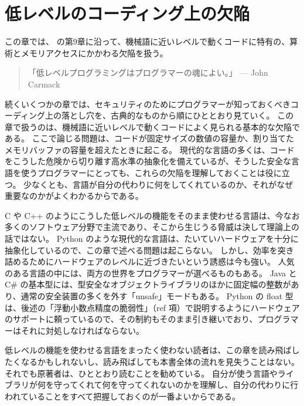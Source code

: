 \documentclass[uplatex]{jsarticle}
\def\ref#1{ref}%
\begin{document}
\section{低レベルのコーディング上の欠陥}

この章では、\cite{Kohnfelder2021} の第9章に沿って、機械語に近いレベルで動くコードに特有の、算術とメモリアクセスにかかわる欠陥を扱う。

\begin{quote}
「低レベルプログラミングはプログラマーの魂によい。」 --- John Carmack
\end{quote}

続くいくつかの章では、セキュリティのためにプログラマーが知っておくべきコーディング上の落とし穴を、古典的なものから順にひととおり見ていく。
この章で扱うのは、機械語に近いレベルで動くコードによく見られる基本的な欠陥である。
ここで論じる問題は、コードが固定サイズの数値の容量か、割り当てたメモリバッファの容量を超えたときに起こる。
現代的な言語の多くは、コードをこうした危険から切り離す高水準の抽象化を備えているが、そうした安全な言語を使うプログラマーにとっても、これらの欠陥を理解しておくことは役に立つ。
少なくとも、言語が自分の代わりに何をしてくれているのか、それがなぜ重要なのかがよくわかるからである。

C や C++ のようにこうした低レベルの機能をそのまま使わせる言語は、今なお多くのソフトウェア分野で主流であり、そこから生じうる脅威は決して理論上の話ではない。
Python のような現代的な言語は、たいていハードウェアを十分に抽象化しているので、この章で述べる問題は起こらない。
しかし、効率を突き詰めるためにハードウェアのレベルに近づきたいという誘惑は今も強い。
人気のある言語の中には、両方の世界をプログラマーが選べるものもある。
Java と C\# の基本型には、型安全なオブジェクトライブラリのほかに固定幅の整数があり、通常の安全装置の多くを外す「unsafe」モードもある。
Python の float 型は、後述の「浮動小数点精度の脆弱性」（\ref{subsec:ch9-floating-point-precision} 項）で説明するようにハードウェアのサポートに頼っているので、その制約もそのまま引き継いでおり、プログラマーはそれに対処しなければならない。

低レベルの機能を使わせる言語をまったく使わない読者は、この章を読み飛ばしたくなるかもしれないし、読み飛ばしても本書全体の流れを見失うことはない。
それでも原著者は、ひととおり読むことを勧めている。
自分が使う言語やライブラリが何を守ってくれて何を守ってくれないのかを理解し、自分の代わりに行われていることをすべて把握しておくのが一番よいからである。
\end{document}
